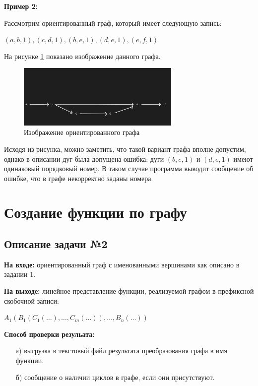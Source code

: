 \documentclass[bachelor, och, otchet]{template}
\begin{document}
\textbf{Пример 2:}

Рассмотрим ориентированный граф, который имеет следующую запись:

\begin{center}
    $(a, b, 1),(c, d, 1),(b, e, 1),(d, e, 1),(e, f, 1)$
\end{center}

На рисунке \ref{p2} показано изображение данного графа.

\begin{figure}[H]
    \centering
    \includegraphics[width=0.7\textwidth]{pics/1.2.png}
    \caption{Изображение ориентированного графа}
    \label{p2}
\end{figure} 

Исходя из рисунка, можно заметить, что такой вариант графа вполне допустим, однако в описании дуг
была допущена ошибка: дуги $(b, e, 1)$ и $(d, e, 1)$ имеют одинаковый порядковый 
номер. В таком случае программа выводит сообщение об ошибке, что в графе некорректно заданы
номера.

\section{Создание функции по графу}

    \subsection{Описание задачи №2}

        \textbf{На входе:} ориентированный граф с именованными вершинами как 
        описано в задании 1.
        
        \textbf{На выходе:} линейное представление функции, реализуемой графом в префиксной скобочной записи:

            \begin{center}
                $A_1(B_1(C_1(\dots), \dots, C_m(\dots)), \dots, B_n(\dots))$
            \end{center}

        \textbf{Способ проверки резульата:}
            \begin{itemize}
                \item[а)] выгрузка в текстовый файл результата преобразования графа в имя функции.
                \item[б)] сообщение о наличии циклов в графе, если они присутствуют.
            \end{itemize}
        
\end{document}
